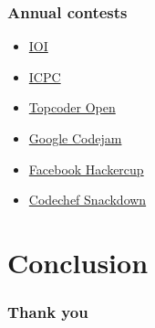\begin{frame}
    \frametitle{Annual contests}
    \begin{itemize}
        \item \href{http://www.ioinformatics.org/index.shtml}{IOI} \\
        \item \href{https://icpc.baylor.edu/}{ICPC} \\
        \item \href{https://tco17.topcoder.com/}{Topcoder Open} \\
        \item \href{https://code.google.com/codejam/}{Google Codejam} \\
        \item \href{https://www.facebook.com/hackercup/}{Facebook Hackercup} \\
        \item \href{https://www.codechef.com/snackdown/}{Codechef Snackdown} \\
    \end{itemize}
\end{frame}

\section{Conclusion}
\begin{frame}
    \frametitle{Thank you}
\end{frame}


